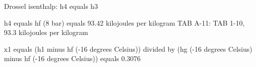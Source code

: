 Drossel isenthalp: h4 equals h3  

h4 equals hf (8 bar) equals 93.42 kilojoules per kilogram  
TAB A-11: TAB 1-10, 93.3 kilojoules per kilogram  

x1 equals (h1 minus hf (-16 degrees Celsius)) divided by (hg (-16 degrees Celsius) minus hf (-16 degrees Celsius))  
equals 0.3076